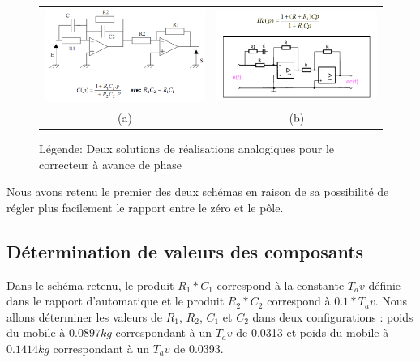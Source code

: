 \documentclass[11pt, french]{article} %
\begin{document}
\begin{figure}[!h]
    \centering
    \begin{tabular}{cc}
      \includegraphics[width=8cm]{SolutionAnalogique/Avph.png} &
      \includegraphics[width=8cm]{SolutionAnalogique/Avph2.png} \\

      (a) & (b)\\
    \end{tabular}
    \caption{Légende: Deux solutions de réalisations analogiques pour le correcteur à avance de phase
    \label{avph_sol_poss}}
\end{figure}








Nous avons retenu le premier des deux schémas en raison de sa possibilité de régler plus facilement le rapport entre le zéro et le pôle. 


\subsection{Détermination de valeurs des composants}

Dans le schéma retenu, le produit $R_1*C_1$ correspond à la constante $ T_av$ définie dans le rapport d'automatique et le produit $R_2*C_2$ correspond à $0.1*T_av$. Nous allons déterminer les valeurs de $R_1$, $R_2$, $C_1$ et $C_2$ dans deux configurations : poids du mobile à $0.0897 kg$ correspondant à un $T_av$ de 0.0313 et poids du mobile à $0.1414 kg$ correspondant à un $T_av$ de 0.0393.
\end{document}
